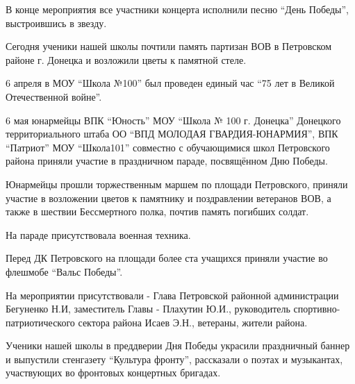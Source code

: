 В конце мероприятия все участники концерта исполнили песню \enquote{День
Победы}, выстроившись в звезду.



Сегодня ученики нашей школы почтили память партизан ВОВ в Петровском районе г.
Донецка и возложили цветы к памятной стеле.



6 апреля в МОУ \enquote{Школа №100} был проведен единый час \enquote{75 лет в
Великой Отечественной войне}.



6 мая юнармейцы ВПК \enquote{Юность} МОУ \enquote{Школа № 100 г. Донецка}
Донецкого территориального штаба ОО \enquote{ВПД МОЛОДАЯ ГВАРДИЯ-ЮНАРМИЯ}, ВПК
\enquote{Патриот} МОУ \enquote{Школа101} совместно с обучающимися школ
Петровского района приняли участие в праздничном параде, посвящённом Дню
Победы.

Юнармейцы прошли торжественным маршем по площади Петровского, приняли участие в
возложении цветов к памятнику и поздравлении ветеранов ВОВ, а также в шествии
Бессмертного полка, почтив память погибших солдат.

На параде присутствовала военная техника.

Перед ДК Петровского на площади более ста учащихся приняли участие во флешмобе
\enquote{Вальс Победы}.

На мероприятии присутствовали - Глава Петровской районной администрации
Бегуненко Н.И, заместитель Главы - Плахутин Ю.И., руководитель спортивно-
патриотического сектора района Исаев Э.Н., ветераны, жители района.



Ученики нашей школы в преддверии Дня Победы украсили праздничный баннер и
выпустили стенгазету \enquote{Культура фронту}, рассказали о поэтах и музыкантах,
участвующих во фронтовых концертных бригадах.

